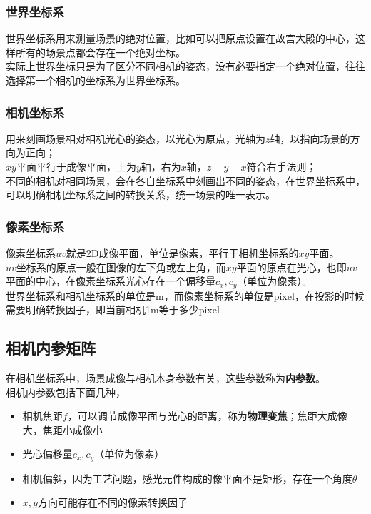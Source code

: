 \documentclass[hpyerref,UTF8,a4paper,titlepage,12pt,oneside]{ctexbook}
\theoremstyle{definition}
\begin{document}
	\subsubsection*{世界坐标系}
		世界坐标系用来测量场景的绝对位置，比如可以把原点设置在故宫大殿的中心，这样所有的场景点都会存在一个绝对坐标。\\

		实际上世界坐标只是为了区分不同相机的姿态，没有必要指定一个绝对位置，往往选择第一个相机的坐标系为世界坐标系。

	\subsubsection*{相机坐标系}
		用来刻画场景相对相机光心的姿态，以光心为原点，光轴为$z$轴，以指向场景的方向为正向；\\

		$xy$平面平行于成像平面，上为$y$轴，右为$x$轴，$z-y-x$符合右手法则；\\

		不同的相机对相同场景，会在各自坐标系中刻画出不同的姿态，在世界坐标系中，可以明确相机坐标系之间的转换关系，统一场景的唯一表示。

	\subsubsection*{像素坐标系}
		像素坐标系$uv$就是2D成像平面，单位是像素，平行于相机坐标系的$xy$平面。\\

		$uv$坐标系的原点一般在图像的左下角或左上角，而$xy$平面的原点在光心，也即$uv$平面的中心，在像素坐标系光心存在一个偏移量$c_x,c_y$（单位为像素）。\\

		世界坐标系和相机坐标系的单位是m，而像素坐标系的单位是pixel，在投影的时候需要明确转换因子，即当前相机1m等于多少pixel

\subsection{相机内参矩阵}
	在相机坐标系中，场景成像与相机本身参数有关，这些参数称为\textbf{内参数}。\\

	相机内参数包括下面几种，
	\begin{itemize}
		\item 相机焦距$f$，可以调节成像平面与光心的距离，称为\textbf{物理变焦}；焦距大成像大，焦距小成像小
		\item 光心偏移量$c_x,c_y$（单位为像素）
		\item 相机偏斜，因为工艺问题，感光元件构成的像平面不是矩形，存在一个角度$\theta$
		\item $x,y$方向可能存在不同的像素转换因子
	\end{itemize}
\end{document}
